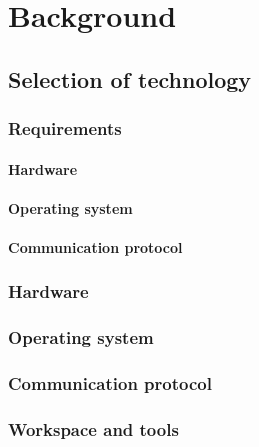 \section{Background}

\subsection{Selection of technology}

\subsubsection{Requirements}

\paragraph{Hardware}

\paragraph{Operating system}

\paragraph{Communication protocol}

\subsubsection{Hardware}

\subsubsection{Operating system}

\subsubsection{Communication protocol}

\subsubsection{Workspace and tools}
